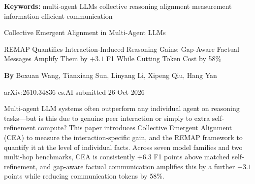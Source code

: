 \documentclass[10pt,twocolumn]{article}
\begin{document}
\setlength{\parindent}{0pt}
\setlength{\parskip}{4pt}

{\small\color{keywordgray}\textbf{Keywords:}
  multi-agent LLMs \textbullet{}
  collective reasoning \textbullet{}
  alignment measurement \textbullet{}
  information-efficient communication}\par\vspace{4pt}

{\LARGE\bfseries\raggedright
  Collective Emergent Alignment in Multi-Agent LLMs}\par\vspace{4pt}

{\large\itshape\raggedright
  REMAP Quantifies Interaction-Induced Reasoning Gains;
  Gap-Aware Factual Messages Amplify Them by $+3.1$ F1
  While Cutting Token Cost by 58\%}\par\vspace{6pt}

{\small\textbf{By} Boxuan Wang, Tianxiang Sun, Linyang Li,
  Xipeng Qiu, Hang Yan}\par\vspace{2pt}

{\small\color{keywordgray}arXiv:2610.34836 \textbullet{} cs.AI
  \textbullet{} submitted 26 Oct 2026}
\par\vspace{2pt}\noindent{\color{rulered}\rule{\columnwidth}{0.6pt}}\vspace{6pt}

Multi-agent LLM systems often outperform any individual agent on
reasoning tasks---but is this due to genuine peer interaction or simply
to extra self-refinement compute? This paper introduces Collective
Emergent Alignment (CEA) to measure the interaction-specific gain, and
the REMAP framework to quantify it at the level of individual facts.
Across seven model families and two multi-hop benchmarks, CEA is
consistently $+6.3$ F1 points above matched self-refinement, and
gap-aware factual communication amplifies this by a further $+3.1$
points while reducing communication tokens by 58\%.
\end{document}
